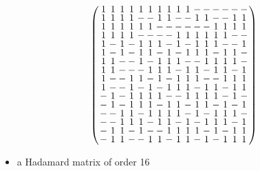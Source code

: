 \documentclass{beamer}
\begin{document}
\begin{frame}

  \[
    \arraycolsep=1.0pt\def\arraystretch{0.75}
    \left(\begin{array}{cccccccccccccccc}
            1&1&1&1&1&1&1&1&1&1&-&-&-&-&-&-\\
            1&1&1&1&-&-&1&1&-&-&1&1&-&-&1&1\\
            1&1&1&1&1&1&-&-&-&-&-&-&1&1&1&1\\
            1&1&1&1&-&-&-&-&1&1&1&1&1&1&-&-\\
            1&-&1&-&1&1&1&-&1&-&1&1&1&-&-&1\\
            1&-&1&-&1&1&-&1&-&1&1&1&-&1&1&-\\
            1&1&-&-&1&-&1&1&1&-&-&1&1&1&1&-\\
            1&1&-&-&-&1&1&1&-&1&1&-&1&1&-&1\\
            1&-&-&1&1&-&1&-&1&1&1&-&-&1&1&1\\
            1&-&-&1&-&1&-&1&1&1&-&1&1&-&1&1\\
            -&1&-&1&1&1&1&-&-&1&1&1&1&-&1&-\\
            -&1&-&1&1&1&-&1&1&-&1&1&-&1&-&1\\
            -&-&1&1&-&1&1&1&1&-&1&-&1&1&1&-\\
            -&-&1&1&1&-&1&1&-&1&-&1&1&1&-&1\\
            -&1&1&-&1&-&-&1&1&1&1&-&1&-&1&1\\
            -&1&1&-&-&1&1&-&1&1&-&1&-&1&1&1\\
          \end{array}\right)
      \]

      \begin{itemize}
      \item a Hadamard matrix of order 16
      \end{itemize}

\end{frame}
\end{document}
